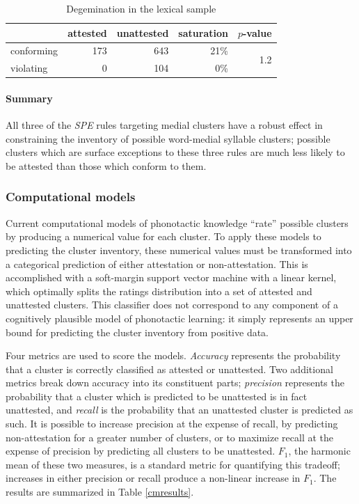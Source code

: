 \begin{table}
\centering
\begin{tabular}{l rrrr}
\toprule
           & attested & unattested & saturation & $p$-value \\
\midrule
conforming & 173      & 643        & 21\%       & \multirow{2}{*}{1.2\e{-10}} \\
violating  & 0        & 104        & 0\%        \\
\bottomrule
\end{tabular}
\caption{Degemination in the lexical sample}
\label{degemtab}
\end{table}

\paragraph{Summary} All three of the \emph{SPE} rules targeting medial clusters have a robust effect in constraining the inventory of possible word-medial syllable clusters; possible clusters which are surface exceptions to these three rules are much less likely to be attested than those which conform to them. 

\subsubsection{Computational models}

Current computational models of phonotactic knowledge ``rate'' possible clusters by producing a numerical value for each cluster. 
To apply these models to predicting the cluster inventory, these numerical values must be transformed into a categorical prediction of either attestation or non-attestation.
This is accomplished with a soft-margin support vector machine \citep{Cortes1995} with a linear kernel, which optimally splits the ratings distribution into a set of attested and unattested clusters.
This classifier does not correspond to any component of a cognitively plausible model of phonotactic learning: it simply represents an upper bound for predicting the cluster inventory from positive data.

Four metrics are used to score the models. 
\emph{Accuracy} represents the probability that a cluster is correctly classified as attested or unattested.
Two additional metrics break down accuracy into its constituent parts;
\emph{precision} represents the probability that a cluster which is predicted to be unattested is in fact unattested, and \emph{recall} is the probability that an unattested cluster is predicted as such.
It is possible to increase precision at the expense of recall, by predicting non-attestation for a greater number of clusters, or to maximize recall at the expense of precision by predicting all clusters to be unattested. 
$F_1$, the harmonic mean of these two measures, is a standard metric for quantifying this tradeoff; increases in either precision or recall produce a  non-linear increase in $F_1$. The results are summarized in Table \ref{cmresults}.

